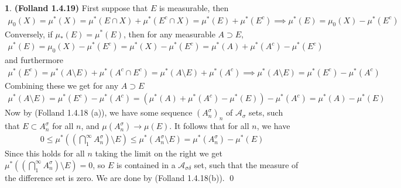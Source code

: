 \documentclass[10.5pt]{article}
\theoremstyle{definition}
\newtheorem{pb}{}
\begin{document}
    \begin{pb}\textbf{(Folland 1.4.19)}
        First suppose that \(E\) is measurable, then
        \begin{align*}
            \mu_0(X) = \mu^*(X) = \mu^*(E \cap X) + \mu^*(E^c \cap X) = \mu^*(E) + \mu^*(E^c) \implies \mu^*(E) = \mu_0(X) - \mu^*(E^c)
        \end{align*}
        Conversely, if \(\mu_*(E) = \mu^*(E)\), then for any measurable \(A \supset E\),
        \begin{align*}
            \mu^*(E) = \mu_0(X) -\mu^*(E^c) = \mu^*(X) - \mu^*(E^c) = \mu^*(A) + \mu^*(A^c) - \mu^*(E^c)
        \end{align*} 
        and furthermore
        \begin{align*}
            \mu^*(E^c) = \mu^*(A \setminus E) + \mu^*(A^c \cap E^c) = \mu^*(A \setminus E) + \mu^*(A^c) \implies \mu^*(A\setminus E) = \mu^*(E^c) - \mu^*(A^c)
        \end{align*}
        Combining these we get for any \(A \supset E\)
        \begin{align*}
            \mu^*(A \setminus E) = \mu^*(E^c) - \mu^*(A^c) = (\mu^*(A) + \mu^*(A^c) - \mu^*(E)) - \mu^*(A^c) = \mu^*(A) - \mu^*(E)
        \end{align*}
        Now by (Folland 1.4.18 (a)), we have some sequence \((A_n^\sigma)_n\) of \(\mathcal{A}_\sigma\) sets, such that \(E \subset A_n^\sigma\) for all \(n\), and \(\mu(A_n^\sigma) \to \mu(E)\). It follows that for all \(n\), we have
        \begin{align*}
            0 \leq \mu^*\left(\left(\bigcap_1^\infty A_n^\sigma\right)\setminus E\right) \leq \mu^*(A_n^\sigma \setminus E) = \mu^*(A_n^\sigma) - \mu^*(E)
        \end{align*}
        Since this holds for all \(n\) taking the limit on the right we get \(\mu^*\left(\left(\bigcap_1^\infty A_n^\sigma\right)\setminus E\right) = 0\), so \(E\) is contained in a \(\mathcal{A}_{\sigma \delta}\) set, such that the measure of the difference set is zero. We are done by (Folland 1.4.18(b)). \qed
    \end{pb}
\end{document}
